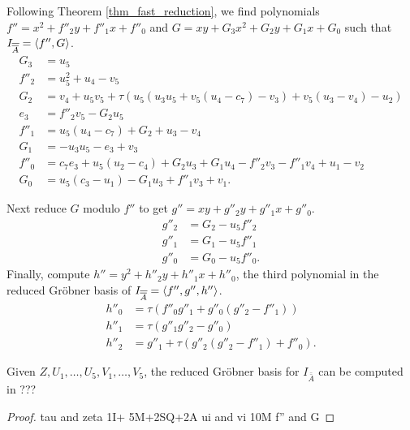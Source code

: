 Following Theorem \ref{thm_fast_reduction},
we find polynomials $f'' = x^2 + f''_2y + f''_1x + f''_0$
and $G = xy + G_3x^2 + G_2y + G_1x + G_0$ such that $I_{\overline{\overline A}} = \left\langle f'', G \right\rangle$.
\begin{align*}
  G_3 &= u_5 \\
  f''_2 &= u_5^2 + u_4 - v_5 \\
  G_2 &= v_4 + u_5v_5 + \tau(u_5(u_3u_5 + v_5(u_4 - c_7) - v_3) + v_5(u_3 - v_4) - u_2) \\
  e_3 &= f''_2v_5 - G_2u_5 \\
  f''_1 &= u_5(u_4 - c_7) + G_2 + u_3 - v_4 \\
  G_1 &= -u_3u_5 - e_3 + v_3 \\
  f''_0 &= c_7e_3 + u_5(u_2 - c_4) + G_2u_3 + G_1u_4 - f''_2v_3 - f''_1v_4 + u_1 - v_2 \\
  G_0 &= u_5(c_3 - u_1) - G_1u_3 + f''_1v_3 + v_1.
\end{align*}
\begin{comment}
\begin{align*}
  G_3 &= u_5 \\
  f''_2 &= u_5(u_5 - c_8) + u_4 - v_5 \\
  G_2 &= v_4 + v_5(u_5 - c_8) + \tau(u_5(u_5(u_3 - c_6) + v_5(u_4 - c_7) + c_5 - v_3) + v_5(u_3 - v_4) - u_2) \\
  e_3 &= f''_2v_5 - G_2u_5 \\
  f''_1 &= u_5(u_4 - c_7) + G_2 + u_3 - v_4 \\
  G_1 &= u_5(c_6 - u_3) - e_3 + v_3 \\
  f''_0 &= c_7e_3 + u_5(u_2 - c_4) + G_2u_3 + G_1u_4 - f''_2v_3 - f''_1v_4 + u_1 - v_2 \\
  G_0 &= -c_6e_3 + u_5(c_3 - u_1) - G_1u_3 + f''_1v_3 + v_1.
\end{align*}
\end{comment}
Next reduce $G$ modulo $f''$ to get $g'' = xy + g''_2y + g''_1x + g''_0$.
\begin{align*}
  g''_2 &= G_2 - u_5f''_2 \\
  g''_1 &= G_1 - u_5f''_1 \\
  g''_0 &= G_0 - u_5f''_0.
\end{align*}
Finally, compute $h'' = y^2 + h''_2y + h''_1x + h''_0$,
the third polynomial in the reduced Gr\"obner basis of $I_{\overline{\overline A}} = \left\langle f'', g'', h'' \right\rangle$.
\begin{align*}
  h''_0 &= \tau(f''_0g''_1 + g''_0(g''_2 - f''_1)) \\
  h''_1 &= \tau(g''_1g''_2 - g''_0) \\
  h''_2 &= g''_1 + \tau(g''_2(g''_2 - f''_1) + f''_0).
\end{align*}

\begin{lemma}
  Given $Z, U_1, \ldots, U_5, V_1, \ldots, V_5$,
  the reduced Gr\"obner basis for $I_{\bar{\bar A}}$ can be computed in ???
\end{lemma}
\begin{proof}
  tau and zeta 1I+ 5M+2SQ+2A
  ui and vi       10M
  f'' and G    
\end{proof}
